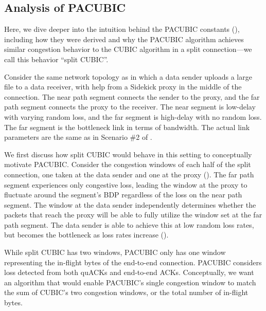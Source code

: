 \subsection{Analysis of PACUBIC}
\label{sec:sidekick:pacubic:analysis}



Here, we dive deeper into the intuition behind the PACUBIC constants
(), including how they were derived and why
the PACUBIC algorithm achieves similar congestion behavior to the CUBIC
algorithm in a split connection---we call this behavior ``split CUBIC''.

Consider the same network topology as  in which a
data sender uploads a large file to a data receiver, with help from a Sidekick
proxy in the middle of the connection. The near path segment connects the sender
to the proxy, and the far path segment connects the proxy to the receiver.
The near segment is low-delay with varying random loss, and the far segment is
high-delay with no random loss. The far segment is the bottleneck link in terms
of bandwidth.
The actual link parameters are the same as in Scenario \#2 of
.

We first discuss how split CUBIC would behave in this setting to conceptually
motivate PACUBIC. Consider the congestion windows of each half of the split
connection, one taken at the data sender and one at the proxy
(). The far path
segment experiences only congestive loss, leading the window at the proxy to
fluctuate around the segment's BDP regardless of the loss on the near path
segment. The window at the data sender independently determines whether the
packets that reach the proxy will be able to fully utilize the window set at
the far path segment. The data sender is able to achieve this at low random
loss rates, but becomes the bottleneck as loss rates increase
().

While split CUBIC has two windows, PACUBIC only has one
window representing the in-flight bytes of the end-to-end connection.
PACUBIC considers loss detected from both quACKs and end-to-end ACKs.
Conceptually, we want an algorithm that would enable PACUBIC's single
congestion window to match the sum of CUBIC's two congestion windows, or
the total number of in-flight bytes.

